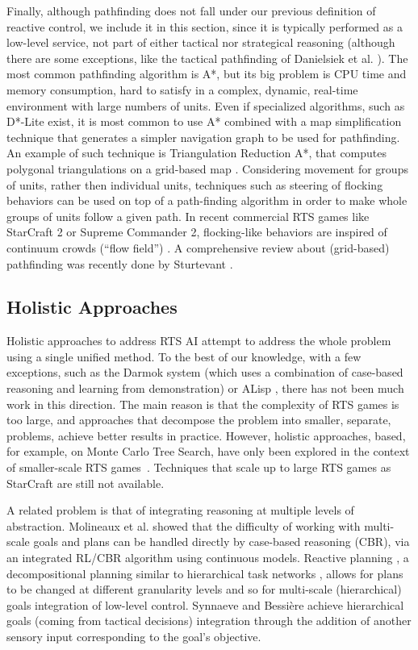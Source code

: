 \documentclass[journal]{IEEEtran}
\begin{document}
Finally, although pathfinding does not fall under our previous definition of reactive control, we include it in this section, since it is typically performed as a low-level service, not part of either tactical nor strategical reasoning (although there are some exceptions, like the tactical pathfinding of Danielsiek et al. \cite{Danielsiek_2008}). The most common pathfinding algorithm is A*, but its big problem is CPU time and memory consumption, hard to satisfy in a complex, dynamic, real-time environment with large numbers of units. Even if specialized algorithms, such as D*-Lite \cite{KoenigL02} exist, it is most common to use A* combined with a map simplification technique that generates a simpler navigation graph to be used for pathfinding. An example of such technique is Triangulation Reduction A*, that computes polygonal triangulations on a grid-based map \cite{Demyen_2006}. Considering movement for groups of units, rather then individual units, techniques such as steering of flocking behaviors \cite{Reynolds_1999} can be used on top of a path-finding algorithm in order to make whole groups of units follow a given path. In recent commercial RTS games like StarCraft 2 or Supreme Commander 2, flocking-like behaviors are inspired of continuum crowds (``flow field'') \cite{Treuille2006}. A comprehensive review about (grid-based) pathfinding was recently done by Sturtevant \cite{sturtevant2012benchmarks}.

\subsection{Holistic Approaches}

Holistic approaches to address RTS AI attempt to address the whole problem using a single unified method. To the best of our knowledge, with a few exceptions, such as the Darmok system \cite{OntanonMSR10} (which uses a combination of case-based reasoning and learning from demonstration) or ALisp \cite{Marthi05}, there has not been much work in this direction.   The main reason is that the complexity of RTS games is too large, and approaches that decompose the problem into smaller, separate, problems, achieve better results in practice. However, holistic approaches, based, for example, on Monte Carlo Tree Search, have only been explored in the context of smaller-scale RTS games~\cite{ontanon2013naive}. Techniques that scale up to large RTS games as StarCraft are still not available.

A related problem is that of integrating reasoning at multiple levels of abstraction. Molineaux et al. \cite{Molineaux08} showed that the difficulty of working with multi-scale goals and plans can be handled directly by case-based reasoning (CBR), via an integrated RL/CBR algorithm using continuous models. Reactive planning \cite{WeberCig10}, a decompositional planning similar to hierarchical task networks \cite{HTNPlanning}, allows for plans to be changed at different granularity levels and so for multi-scale (hierarchical) goals integration of low-level control. Synnaeve and Bessi\`{e}re \cite{SynnaeveMicroCig11} achieve hierarchical goals (coming from tactical decisions) integration through the addition of another sensory input corresponding to the goal's objective. 
\end{document}

